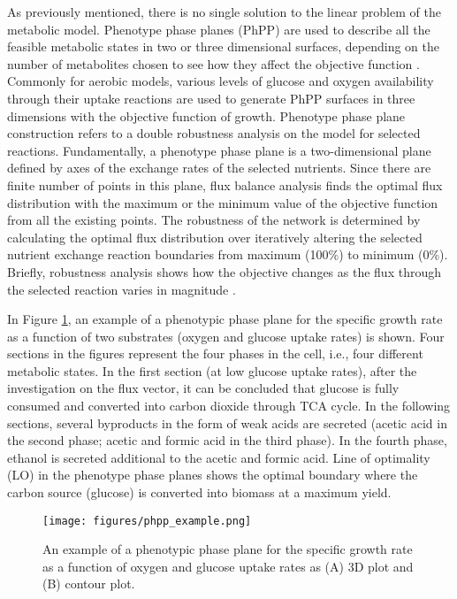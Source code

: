 As previously mentioned, there is no single solution to the linear problem of the metabolic model. Phenotype phase planes (PhPP) are used to describe all the feasible metabolic states in two or three dimensional surfaces, depending on the number of metabolites chosen to see how they affect the objective function \cite{edwards2002characterizing}. Commonly for aerobic models, various levels of glucose and oxygen availability through their uptake reactions are used to generate PhPP surfaces in three dimensions with the objective function of growth. Phenotype phase plane construction refers to a double robustness analysis on the model for selected reactions. Fundamentally, a phenotype phase plane is a two-dimensional plane defined by axes of the exchange rates of the selected nutrients. Since there are finite number of points in this plane, flux balance analysis finds the optimal flux distribution with the maximum or the minimum value of the objective function from all the existing points. The robustness of the network is determined by calculating the optimal flux distribution over iteratively altering the selected nutrient exchange reaction boundaries from maximum (100\%) to minimum (0\%). Briefly, robustness analysis shows how the objective changes as the flux through the selected reaction varies in magnitude \cite{edwards2002characterizing}.

In Figure \ref{fig:phpp_example}, an example of a phenotypic phase plane for the specific growth rate as a function of two substrates (oxygen and glucose uptake rates) is shown. Four sections in the figures represent the four phases in the cell, i.e., four different metabolic states. In the first section (at low glucose uptake rates), after the investigation on the flux vector, it can be concluded that glucose is fully consumed and converted into carbon dioxide through TCA cycle. In the following sections, several byproducts in the form of weak acids are secreted (acetic acid in the second phase; acetic and formic acid in the third phase). In the fourth phase, ethanol is secreted additional to the acetic and formic acid. Line of optimality (LO) in the phenotype phase planes shows the optimal boundary where the carbon source (glucose) is converted into biomass at a maximum yield.

\begin{figure}[H]
\begin{center}
\texttt{[image: figures/phpp\_example.png]}
\caption[An example of a phenotypic phase plane for the specific growth rate as a function of oxygen and glucose uptake rates as (A) 3D plot and (B) contour plot]{An example of a phenotypic phase plane for the specific growth rate as a function of oxygen and glucose uptake rates as (A) 3D plot and (B) contour plot.}
\label{fig:phpp_example}
\end{center}
\end{figure}



